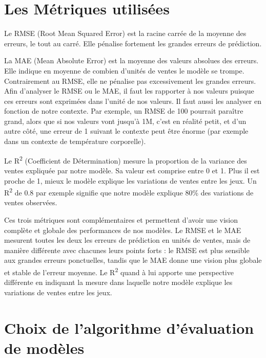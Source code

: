 \documentclass[mstat,12pt]{unswthesis}
\begin{document}
	
\hypertarget{LesMétriquesUtilisées}{%
\section{\textbf{Les Métriques utilisées}}\label{LesMétriquesUtilisées}}

Le RMSE (Root Mean Squared Error) est la racine carrée de la moyenne des erreurs, le tout au carré. Elle pénalise fortement les grandes erreurs de prédiction. 

La MAE (Mean Absolute Error) est la moyenne des valeurs absolues des erreurs. Elle indique en moyenne de combien d'unités de ventes le modèle se trompe. Contrairement au RMSE, elle ne pénalise pas excessivement les grandes erreurs. Afin d’analyser le RMSE ou le MAE, il faut les rapporter à nos valeurs puisque ces erreurs sont exprimées dans l’unité de nos valeurs. Il faut aussi les analyser en fonction de notre contexte. Par exemple, un RMSE de 100 pourrait paraître grand, alors que si nos valeurs vont jusqu’à 1M, c’est en réalité petit, et d’un autre côté, une erreur de 1 suivant le contexte peut être énorme (par exemple dans un contexte de température corporelle).

Le R\textsuperscript{2} (Coefficient de Détermination) mesure la proportion de la variance des ventes expliquée par notre modèle. Sa valeur est comprise entre 0 et 1. Plus il est proche de 1, mieux le modèle explique les variations de ventes entre les jeux. Un R\textsuperscript{2} de 0.8 par exemple signifie que notre modèle explique 80\% des variations de ventes observées.

Ces trois métriques sont complémentaires et permettent d'avoir une vision complète et globale des performances de nos modèles. Le RMSE et le MAE mesurent toutes les deux les erreurs de prédiction en unités de ventes, mais de manière différente avec chacunes leurs points forts : le RMSE est plus sensible aux grandes erreurs ponctuelles, tandis que le MAE donne une vision plus globale et stable de l'erreur moyenne. Le R\textsuperscript{2} quand à lui apporte une perspective différente en indiquant la mesure dans laquelle notre modèle explique les variations de ventes entre les jeux.


\hypertarget{ChoixDeLalgorithmeDévaluationDeModèles}{%
\section{\textbf{Choix de l’algorithme d’évaluation de modèles}}\label{ChoixDeLalgorithmeDévaluationDeModèles}}
\end{document}
